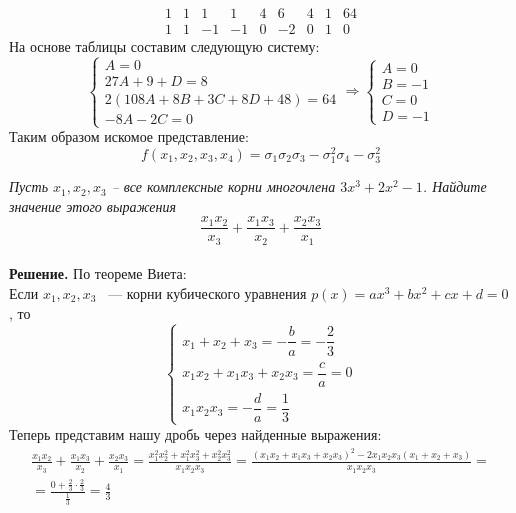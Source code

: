 \documentclass[a4paper, 12pt]{article}
\begin{document}
\begin{spacing}{1}
$$\begin{array}{c|c|c|c|c|c|c|c|c}
\hline
1 & 1 & 1 & 1 & 4 & 6 & 4 & 1 & 64\\
\hline
1 & 1 & -1 & -1 & 0 & -2 & 0 & 1 & 0
\end{array}
$$
На основе таблицы составим следующую систему:
$$
\begin{cases}
A = 0\\
27A+9+D=8\\
2 (108 A + 8B + 3C + 8D + 48)=64\\
-8 A - 2 C = 0
\end{cases} \Rightarrow \begin{cases}
A = 0\\
B=-1\\
C=0\\
D=-1
\end{cases}
$$
Таким образом искомое представление:
$$
f(x_1,x_2,x_3,x_4)=\sigma_1\sigma_2\sigma_3-\sigma_1^2\sigma_4-\sigma_3^2
$$






\newpage
\begin{center}
\end{center}

\noindent \textit{Пусть $x_1, x_2, x_3$ -- все комплексные  корни многочлена $3x^3+2x^2-1$. Найдите значение этого выражения
$$
\frac{x_1x_2}{x_3}+\frac{x_1x_3}{x_2}+\frac{x_2x_3}{x_1}
$$}\\
\noindent \textbf{Решение.} По теореме Виета:\\
Если $\displaystyle x_{1},x_{2},x_{3}$  — корни кубического уравнения $\displaystyle p(x)=ax^{3}+bx^{2}+cx+d=0$ , то
$$
\begin{cases} x_1 + x_2 + x_3 = -\dfrac{b}{a}=-\dfrac{2}{3}\\[12pt]
x_1 x_2 + x_1 x_3 + x_2 x_3 = \dfrac{c}{a} =0\\[12pt]
x_1 x_2 x_3 = -\dfrac{d}{a} = \dfrac{1}{3}
\end{cases}
$$
Теперь представим нашу дробь через найденные выражения:
\begin{gather*}
\frac{x_1x_2}{x_3}+\frac{x_1x_3}{x_2}+\frac{x_2x_3}{x_1} = \frac{x_1^2x_2^2+x_1^2x_3^2+x_2^2x_3^2}{x_1x_2x_3} = \frac{(x_1x_2+x_1x_3+x_2x_3)^2-2x_1x_2x_3(x_1+x_2+x_3)}{x_1x_2x_3} =\\
= \frac{0+\frac{2}{3}\cdot\frac{2}{3}}{\frac{1}{3}} = \frac{4}{3}
\end{gather*}






\end{spacing}
\end{document}
